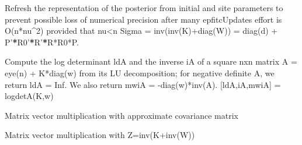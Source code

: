 \documentclass[letterpaper,10pt,english]{sphinxmanual}
\begin{document}
\begin{fulllineitems}
\begin{fulllineitems}
\end{fulllineitems}


\begin{fulllineitems}
\label{Likelihoods:pyGPs.Core.inf.Inference.fitcRefresh}
Refresh the representation of the posterior from initial and site parameters
to prevent possible loss of numerical precision after many epfitcUpdates
effort is O(n*nu\textasciicircum{}2) provided that nu\textless{}n
Sigma = inv(inv(K)+diag(W)) = diag(d) + P'{\color{red}\bfseries{}*}R0'{\color{red}\bfseries{}*}R'{\color{red}\bfseries{}*}R*R0*P.

\end{fulllineitems}


\begin{fulllineitems}
\label{Likelihoods:pyGPs.Core.inf.Inference.logdetA}
Compute the log determinant ldA and the inverse iA of a square nxn matrix
A = eye(n) + K*diag(w) from its LU decomposition; for negative definite A, we 
return ldA = Inf. We also return mwiA = -diag(w)*inv(A).
{[}ldA,iA,mwiA{]} = logdetA(K,w)

\end{fulllineitems}


\begin{fulllineitems}
\label{Likelihoods:pyGPs.Core.inf.Inference.mvmK}
Matrix vector multiplication with approximate covariance matrix

\end{fulllineitems}


\begin{fulllineitems}
\label{Likelihoods:pyGPs.Core.inf.Inference.mvmZ}
Matrix vector multiplication with Z=inv(K+inv(W))

\end{fulllineitems}



\end{fulllineitems}
\end{document}
